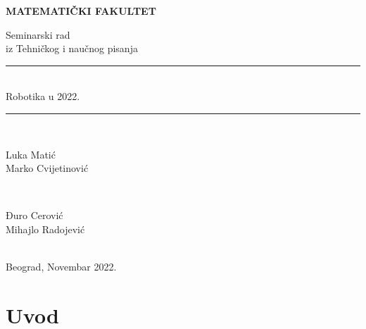 \documentclass{article}
\newcommand{\HRule}{\rule{\linewidth}{0.5mm}}
\begin{document}
	\vspace*{5cm}
	\thispagestyle{empty}
	\centerline{\huge \textbf{MATEMATIČKI FAKULTET}}
	\vspace{2cm}
	
	\begin{center}
		
		{\Large Seminarski rad}\\
		{\Large	iz Tehničkog i naučnog pisanja}\\
		\Huge\HRule\\[0.4cm] %
		{Robotika u 2022.}\\
		\HRule \\[20pt] %
		\begin{minipage}{0.4\textwidth}
			\begin{flushleft} \large
				{\Large Luka Matić}\\
				{\Large Marko Cvijetinović}
			\end{flushleft}
		\end{minipage}
		~
		\begin{minipage}{0.4\textwidth}
			\begin{flushright} \large
				{\Large Đuro Cerović} \\
				{\Large Mihajlo Radojević}\\ 
			\end{flushright}
		\end{minipage}\\[5cm]
		\Large{Beograd, Novembar 2022.}
	\end{center}
	\pagebreak
 \begin{abstract}
     Ovaj tekst je napravljen da vam prikaže napredak robotike do danas.\\
      U samom uvodu postoje neke činjenice i zakoni koje verovatne niste znali a odnose se na robote i robotiku. Obratite pažnju na to koliko je zapravo sama robotika i veštačka inteligencija u robotici napredovala a da niste ni primetili. Pomoću naučnih istraživanja i stručnjaka koji su istaživali i pisali o robotici, mi smo to prikupili u ovom radu, kako bi vam ukratko pokazali neke interesantne stvari i činjenice. Nadam se da ćete da uživate u našem radu i naći nešto korisno što će vam poslužiti.
    
 \end{abstract}
	\tableofcontents
    \pagebreak
	\section{Uvod}
	
\end{document}
